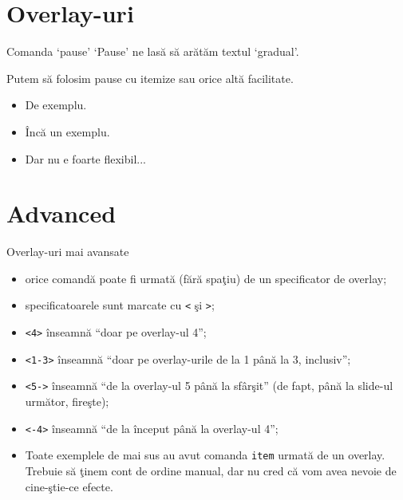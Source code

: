 \documentclass{beamer}
\begin{document}
\section{Overlay-uri}

\begin{frame}{Comanda `pause'}
  `Pause' ne lasă să arătăm textul `gradual'.

  \pause Putem să folosim pause cu itemize sau orice altă facilitate.
  \begin{itemize}
    \pause \item De exemplu.
    \pause \item Încă un exemplu.
    \pause \item Dar nu e foarte flexibil...
  \end{itemize}
\end{frame}

\section{Advanced}

\begin{frame}{Overlay-uri mai avansate}
  \begin{itemize}
  \item<3-> orice comandă poate fi urmată (fără spaţiu) de un specificator de
    overlay;
  \item<4-> specificatoarele sunt marcate cu \texttt{<} şi \texttt{>};
  \item<5-> \texttt{<4>} înseamnă ``doar pe overlay-ul 4'';
  \item<5-> \texttt{<1-3>} înseamnă ``doar pe overlay-urile de la 1 până la 3,
    inclusiv'';
  \item<6-> \texttt{<5->} înseamnă ``de la overlay-ul 5 până la sfârşit'' (de
    fapt, până la slide-ul următor, fireşte);
  \item<6-> \texttt{<-4>} înseamnă ``de la început până la overlay-ul 4'';
  \item<7-> Toate exemplele de mai sus au avut comanda \texttt{item} urmată de
    un overlay. Trebuie să ţinem cont de ordine manual, dar nu cred că vom avea
    nevoie de cine-ştie-ce efecte.
  \end{itemize}
\end{frame}
\end{document}
